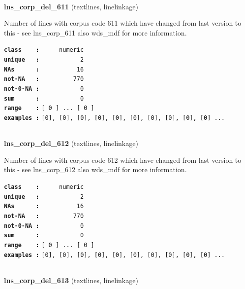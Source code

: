 \documentclass[]{article}
\begin{document}
~

\textbf{lns\_corp\_del\_611} (textlines, linelinkage)

Number of lines with corpus code 611 which have changed from last
version to this - see lns\_corp\_611 also wds\_mdf for more information.

\textbf{\texttt{class\ \ \ \ :}} \texttt{~~~~~numeric}\\
\textbf{\texttt{unique\ \ \ :}} \texttt{~~~~~~~~~~~2}\\
\textbf{\texttt{NAs\ \ \ \ \ \ :}} \texttt{~~~~~~~~~~16}\\
\textbf{\texttt{not-NA\ \ \ :}} \texttt{~~~~~~~~~770}\\
\textbf{\texttt{not-0-NA\ :}} \texttt{~~~~~~~~~~~0}\\
\textbf{\texttt{sum\ \ \ \ \ \ :}} \texttt{~~~~~~~~~~~0}\\
\textbf{\texttt{range\ \ \ \ :}}
\texttt{{[}\ 0\ {]}\ ...\ {[}\ 0\ {]}}\\
\textbf{\texttt{examples\ :}}
\texttt{{[}0{]},\ {[}0{]},\ {[}0{]},\ {[}0{]},\ {[}0{]},\ {[}0{]},\ {[}0{]},\ {[}0{]},\ {[}0{]},\ {[}0{]}\ ...}\\

~

\textbf{lns\_corp\_del\_612} (textlines, linelinkage)

Number of lines with corpus code 612 which have changed from last
version to this - see lns\_corp\_612 also wds\_mdf for more information.

\textbf{\texttt{class\ \ \ \ :}} \texttt{~~~~~numeric}\\
\textbf{\texttt{unique\ \ \ :}} \texttt{~~~~~~~~~~~2}\\
\textbf{\texttt{NAs\ \ \ \ \ \ :}} \texttt{~~~~~~~~~~16}\\
\textbf{\texttt{not-NA\ \ \ :}} \texttt{~~~~~~~~~770}\\
\textbf{\texttt{not-0-NA\ :}} \texttt{~~~~~~~~~~~0}\\
\textbf{\texttt{sum\ \ \ \ \ \ :}} \texttt{~~~~~~~~~~~0}\\
\textbf{\texttt{range\ \ \ \ :}}
\texttt{{[}\ 0\ {]}\ ...\ {[}\ 0\ {]}}\\
\textbf{\texttt{examples\ :}}
\texttt{{[}0{]},\ {[}0{]},\ {[}0{]},\ {[}0{]},\ {[}0{]},\ {[}0{]},\ {[}0{]},\ {[}0{]},\ {[}0{]},\ {[}0{]}\ ...}\\

~

\textbf{lns\_corp\_del\_613} (textlines, linelinkage)
\end{document}
